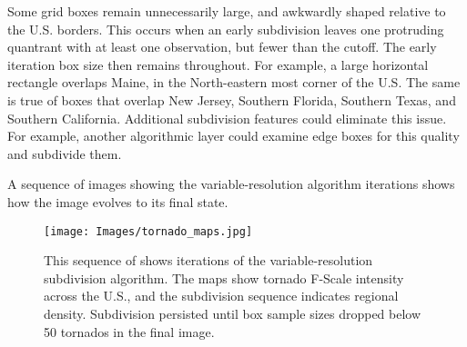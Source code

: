 Some grid boxes remain unnecessarily large, and awkwardly shaped relative to the U.S. borders. This occurs when an early subdivision leaves one protruding quantrant with at least one observation, but fewer than the cutoff. The early iteration box size then remains throughout. For example, a large horizontal rectangle overlaps Maine, in the North-eastern most corner of the U.S. The same is true of boxes that overlap New Jersey, Southern Florida, Southern Texas, and Southern California. Additional subdivision features could eliminate this issue. For example, another algorithmic layer could examine edge boxes for this quality and subdivide them.

A sequence of images showing the variable-resolution algorithm iterations shows how the image evolves to its final state.

        \begin{figure}[H]
      	\centering      
      	\texttt{[image: Images/tornado\_maps.jpg]}
      	\caption{This sequence of shows iterations of the variable-resolution subdivision algorithm. The maps show tornado F-Scale intensity across the U.S., and the subdivision sequence indicates regional density. Subdivision persisted until box sample sizes dropped below 50 tornados in the final image.}
        \end{figure}




% 
% 
% 
% 